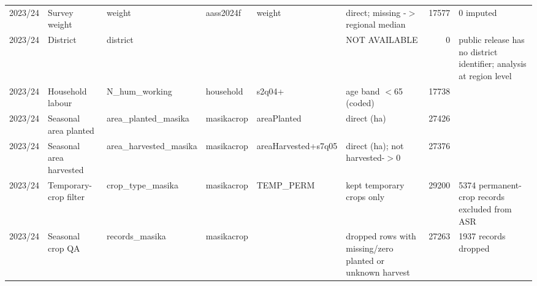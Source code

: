 \begin{tabular}{llllllrl}
 2023/24         & Survey weight             & weight                    & aass2024f                        & weight                                    & direct; missing -\ensuremath{>} regional median                                                                           &   17577 & 0 imputed                                                                                      \\
 2023/24         & District                  & district                  &                                  &                                           & NOT AVAILABLE                                                                                                &       0 & public release has no district identifier; analysis at region level                            \\
 2023/24         & Household labour          & N\_hum\_working             & household                        & s2q04+                                    & age band \ensuremath{<}65 (coded)                                                                                         &   17738 &                                                                                                \\
 2023/24         & Seasonal area planted     & area\_planted\_masika       & masikacrop                       & areaPlanted                               & direct (ha)                                                                                                  &   27426 &                                                                                                \\
 2023/24         & Seasonal area harvested   & area\_harvested\_masika     & masikacrop                       & areaHarvested+s7q05                       & direct (ha); not harvested-\ensuremath{>}0                                                                                &   27376 &                                                                                                \\
 2023/24         & Temporary-crop filter     & crop\_type\_masika          & masikacrop                       & TEMP\_PERM                                 & kept temporary crops only                                                                                    &   29200 & 5374 permanent-crop records excluded from ASR                                                  \\
 2023/24         & Seasonal crop QA          & records\_masika            & masikacrop                       &                                           & dropped rows with missing/zero planted or unknown harvest                                                    &   27263 & 1937 records dropped                                                                           \\

\end{tabular}
